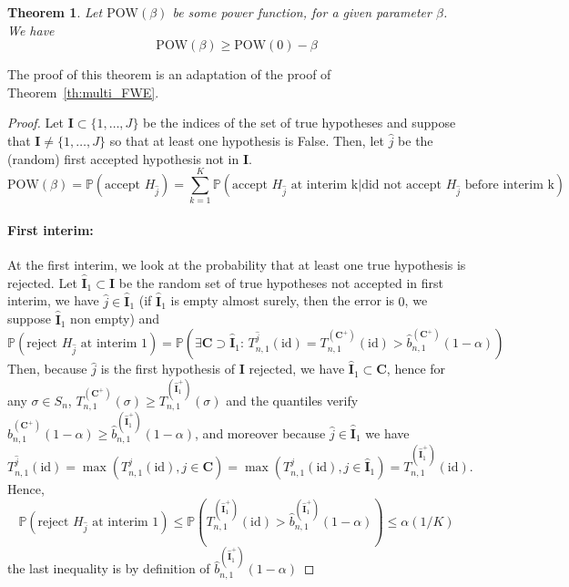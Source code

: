 \documentclass{article}
\theoremstyle{plain}
\newtheorem{Theorem}{Theorem}
\theoremstyle{remark}
\renewcommand{\P}{\mathbb{P}}
\newcommand{\1}{\mathbbm{1}}
\newcommand{\id}{\mathrm{id}}
\numberwithin{equation}{section}
\begin{document}
\begin{Theorem}
Let $\mathrm{POW}(\beta)$ be some power function, for a given parameter $\beta$. We have
$$\mathrm{POW}(\beta) \ge \mathrm{POW}(0) - \beta $$
\end{Theorem}
The proof of this theorem is an adaptation of the proof of Theorem~\ref{th:multi_FWE}.
\begin{proof}
Let $\textbf{I}\subset\{1,\dots,J\}$ be the indices of the set of true hypotheses and suppose that  $\textbf{I}\neq\{1,\dots,J\}$ so that at least one hypothesis is False. Then, let $\widehat{j}$ be the (random) first accepted hypothesis not in $\textbf{I}$.
\begin{equation}\label{eq:multi2}
\mathrm{POW}(\beta) = \P\left( \text{accept }H_{\widehat{j}}  \right)= \sum_{k=1}^K \P\left(\text{accept }H_{\widehat{j}} \text{ at interim k} \Big| \text{did not accept }H_{\widehat{j}} \text{ before interim k} \right) 
\end{equation}


\paragraph{First interim:}

At the first interim, we look at the probability that at least one true hypothesis is rejected. Let $\widehat{\textbf{I}}_1 \subset \textbf{I}$ be the random set of true hypotheses not accepted in first interim, we have $\widehat{j}\in \widehat{\textbf{I}}_1$ (if $\widehat{\textbf{I}}_1$ is empty almost surely, then the error is $0$, we suppose $\widehat{\textbf{I}}_1$ non empty) and
$$\P\left(\text{reject }H_{\widehat{j}} \text{ at interim 1}\right)= \P\left( \exists \textbf{C}\supset \widehat{\textbf{I}}_1: \, T_{n,1}^{\widehat{j}}(\id) = T_{n,1}^{(\textbf{C}^+)}(\id) > \widehat{b}_{n,1}^{(\textbf{C}^+)}(1-\alpha) \right) $$
Then, because $\widehat{j}$ is the first hypothesis of $\textbf{I}$ rejected, we have $\widehat{\textbf{I}}_1 \subset \textbf{C}$, hence for any $\sigma \in S_n$, $ T_{n,1}^{(\textbf{C}^+)}(\sigma)\ge T_{n,1}^{(\widehat{\textbf{I}}_1^+)}(\sigma)$ and the quantiles verify $ \widehat{b}_{n,1}^{(\textbf{C}^+)}(1-\alpha) \ge \widehat{b}_{n,1}^{(\widehat{\textbf{I}}_1^+)}(1-\alpha)$,
 and moreover because $\widehat{j} \in \widehat{\textbf{I}}_1$ we have
$$T_{n,1}^{\widehat{j}}(\id)=\max(T_{n,1}^{j}(\id), j \in  \textbf{C}) = \max(T_{n,1}^{j}(\id), j \in  \widehat{\textbf{I}}_1) = T_{n,1}^{(\widehat{\textbf{I}}_1^+)}(\id).$$
Hence,
\begin{equation}\label{eq:interim1_multi}
\P\left(\text{reject }H_{\widehat{j}} \text{ at interim 1}\right)\le \P\left( T_{n,1}^{(\widehat{\textbf{I}}_1^+)}(\id) > \widehat{b}_{n,1}^{(\widehat{\textbf{I}}_1^+)}(1-\alpha) \right) \le  \alpha(1/K) 
\end{equation}
the last inequality is by definition of $\widehat{b}_{n,1}^{(\widehat{\textbf{I}}_1^+)}(1-\alpha)$


\end{proof}
\end{document}
